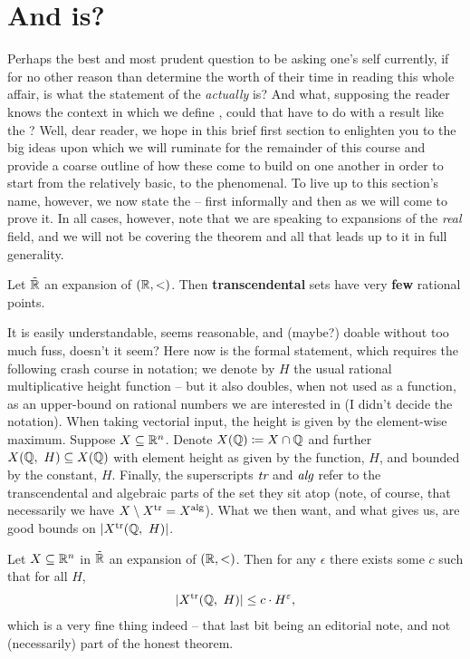 \section{And \pw is?}
\noindent Perhaps the best and most prudent question to be asking one's self currently, if for no other reason than determine the worth of their time in reading this whole affair, is what the statement of the \pwt \emph{actually} is? And what, supposing the reader knows the context in which we define \omy, could that have to do with a \ntc result like the \pwt? Well, dear reader, we hope in this brief first section to enlighten you to the big ideas upon which we will ruminate for the remainder of this course and provide a coarse outline of how these come to build on one another in order to start from the relatively basic, to the phenomenal. To live up to this section's name, however, we now state the \pwt -- first informally and then as we will come to prove it. In all cases, however, note that we are speaking to \om expansions of the \emph{real} field, and we will not be covering the theorem and all that leads up to it in full generality.

\begin{theorem}
  \label{thm:pwt_informal}
  Let $\tilde{\mathbb{R}}$ an \om expansion of $(\mathbb{R}, <)$. Then \textbf{transcendental}  sets have very \textbf{few} rational points.
\end{theorem}

It is easily understandable, seems reasonable, and (maybe?) doable without too much fuss, doesn't it seem? Here now is the formal statement, which requires the following crash course in notation; we denote by $H$ the usual rational multiplicative height function -- but it also doubles, when not used as a function, as an upper-bound on rational numbers we are interested in (I didn't decide the notation). When taking vectorial input, the height is given by the element-wise maximum. Suppose $X \subseteq \mathbb{R}^n$. Denote $X(\mathbb{Q}) \coloneqq X \cap \mathbb{Q}$ and further $X(\mathbb{Q}, \ H) \subseteq X(\mathbb{Q})$ with element height as given by the function, $H$, and bounded by the constant, $H$. Finally, the superscripts $\emph{tr}$ and $\emph{alg}$ refer to the transcendental and algebraic parts of the set they sit atop (note, of course, that necessarily we have $X \setminus X^{\textrm{tr}} = X^{\textrm{alg}}$). What we then want, and what \pw gives us, are good bounds on $\vert X^{\textrm{tr}}(\mathbb{Q}, \ H)\vert$.

\begin{theorem}
  \label{thm:pwt_formal}
  Let $X \subseteq \mathbb{R}^n$  in $\tilde{\mathbb{R}}$ an \om expansion of $(\mathbb{R}, <)$. Then for any $\epsilon$ there exists some $c$ such that for all $H$,
  \begin{align*}
    \vert X^{\textrm{tr}}(\mathbb{Q}, \ H)\vert \leq c \cdot H^{\varepsilon},
  \end{align*}
  which is a very fine thing indeed -- that last bit being an editorial note, and not (necessarily) part of the honest theorem.
\end{theorem}


